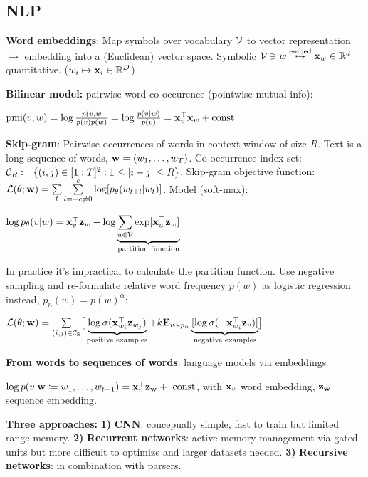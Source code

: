 
\subsection{NLP}
\label{sub:nlp}
    \textbf{Word embeddings}: Map symbols over vocabulary $\mathcal{V}$ to vector representation $\xrightarrow{}$ embedding into a (Euclidean) vector space. Symbolic $\mathcal{V}\ni w \overset{\text{embed}}{\mapsto}\mathbf x_w\in\mathbb R^d$ quantitative. ($w_i\mapsto\mathbf x_i\in\mathbb R^D$)
    
    \textbf{Bilinear model:} pairwise word co-occurence (pointwise mutual info):
    
    $\text{pmi}(v,w)=\log\frac{p(v,w}{p(v)p(w)}=\log\frac{p(v|w)}{p(v)}=\mathbf x_v^\top\mathbf x_w + \text{const}$
    
    \textbf{Skip-gram}: Pairwise occurrences of words in context window of size $R$. Text is a long sequence of words, $\mathbf w=(w_1,\ldots,w_T)$. Co-occurrence index set: $\mathcal{C}_R\coloneqq\{(i,j)\in \lbrack 1:T\rbrack^2:1\leq\lvert i-j\rvert\leq R\}$. Skip-gram objective function: $\mathcal{L}(\theta;\mathbf w)=\sum\limits_t\sum\limits_{l=-c\neq 0}^c\log\lbrack{p_\theta (w_{t+l}|w_t)}\rbrack$. Model (soft-max): 
    
    \tab$\log p_\theta(v|w)=\mathbf x_v^{\mathop{\mathrm{\top}}}\mathbf z_w-\log\underbrace{\sum_{u\in\mathcal{V}}\exp\lbrack\mathbf x_u^{\mathop{\mathrm{\top}}}\mathbf z_w\rbrack}_\text{partition function}$
    
    In practice it's impractical to calculate the partition function. Use negative sampling and re-formulate relative word frequency $p(w)$ as logistic regression instead, $p_n(w)=p(w)^\alpha$:
    
    \tab$\mathcal{L}(\theta;\mathbf w)=\sum\limits_{(i,j)\in\mathcal{C}_\mathbb R}\bigr\lbrack\underbrace{\log\sigma(\mathbf x_{w_i}^{\mathop{\mathrm{\top}}}\mathbf z_{w_j})}_\text{positive examples}+k\mathbf E_{v\sim p_n}\underbrace{\lbrack\log\sigma(-\mathbf x_{w_i}^{\mathop{\mathrm{\top}}}\mathbf z_v)\rbrack}_\text{negative examples}\bigr\rbrack$
    
    \textbf{From words to sequences of words}: language models via embeddings
    
    \tab$\log p(v|\mathbf w\coloneqq w_1,\ldots,w_{t-1})=\mathbf x_v^{\mathop{\mathrm{\top}}}\mathbf z_\mathbf w+\text{ const}$, with $\mathbf x_v$ word embedding, $\mathbf z_\mathbf w$ sequence embedding.
    
    \textbf{Three approaches:} \textbf{1)} \textbf{CNN}: concepually simple, fast to train but limited range memory. \textbf{2)} \textbf{Recurrent networks}: active memory management via gated units but more difficult to optimize and larger datasets needed. \textbf{3)} \textbf{Recursive networks}: in combination with parsers.
    
